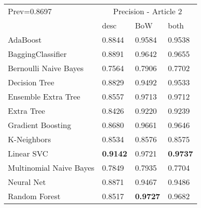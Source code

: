 \begin{tabular}{|l|l|l|l| }
\hline
Prev=0.8697 &  \multicolumn{3}{c|}{Precision - Article 2} \\
\cline{2-4} & desc & BoW & both \\ \hline
AdaBoost                & 0.8844 & 0.9584 & 0.9538\\
BaggingClassifier       & 0.8891 & 0.9642 & 0.9655\\
Bernoulli Naive Bayes   & 0.7564 & 0.7906 & 0.7702\\
Decision Tree           & 0.8829 & 0.9492 & 0.9533\\
Ensemble Extra Tree     & 0.8557 & 0.9713 & 0.9712\\
Extra Tree              & 0.8426 & 0.9220 & 0.9239\\
Gradient Boosting       & 0.8680 & 0.9661 & 0.9646\\
K-Neighbors             & 0.8534 & 0.8576 & 0.8575\\
Linear SVC              & {\bf 0.9142} & 0.9721 & {\bf 0.9737}\\
Multinomial Naive Bayes & 0.7849 & 0.7935 & 0.7704\\
Neural Net              & 0.8871 & 0.9467 & 0.9486\\
Random Forest           & 0.8517 & {\bf 0.9727} & 0.9682\\
\hline
\end{tabular}